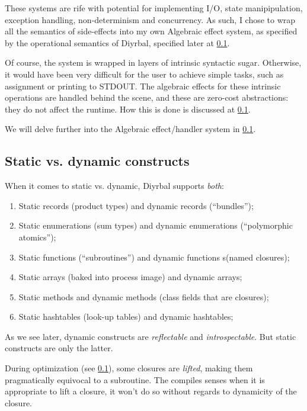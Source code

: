 \documentclass[a4paper,12pt]{article}
\newcommand{\nm}{Diyrbal\xspace}
\begin{document}
These systems are rife with potential for implementing I/O, state manipipulation, exception handling, non-determinism and concurrency. As such, I chose to wrap all the semantics of side-effects into my own Algebraic effect system, as specified by the operational semantics of \nm, specified later at \ref{}.

Of course, the system is wrapped in layers of intrinsic syntactic sugar. Otherwise, it would have been very difficult for the user to achieve simple tasks, such as assignment or printing to STDOUT. The algebraic effects for these intrinsic operations are handled behind the scene, and these are zero-cost abstractions: they do not affect the runtime. How this is done is discussed at \ref{}.

We will delve further into the Algebraic effect/handler system in \ref{}.

\subsection{Static vs. dynamic constructs}

When it comes to static vs. dynamic, \nm supports \textit{both}:

\begin{enumerate}
	\item Static records (product types) and dynamic records (``bundles'');
	\item Static enumerations (sum types) and dynamic enumerations (``polymorphic atomics'');
	\item Static functions (``subroutines'') and dynamic functions s(named closures);
	\item Static arrays (baked into process image) and dynamic arrays;
	\item Static methods and dynamic methods (class fields that are closures);
	\item Static hashtables (look-up tables) and dynamic hashtables;
\end{enumerate}

As we see later, dynamic constructs are \textit{reflectable} and \textit{introspectable}. But static constructs are only the latter. 

During optimization (see \ref{}), some closures are \textit{lifted}, making them pragmatically equivocal to a subroutine. The compiles senses when it is appropriate to lift a closure, it won't do so without regards to dynamicity of the closure.
\end{document}
